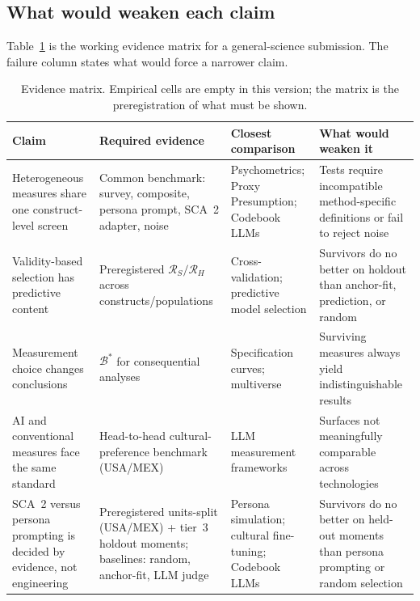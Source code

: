\documentclass[10pt,letterpaper]{article}
\newcommand{\Rset}{\mathcal{R}}
\newcommand{\Bset}{\mathcal{B}}
\begin{document}
\subsection{What would weaken each claim}
Table~\ref{tab:evidence} is the working evidence matrix for a general-science submission.
The failure column states what would force a narrower claim.

\begin{table}[t]
\centering
\footnotesize
\caption{Evidence matrix.
Empirical cells are empty in this version; the matrix is the preregistration of what must be shown.}
\label{tab:evidence}
\begin{tabularx}{\textwidth}{@{}>{\raggedright\arraybackslash}p{2.5cm} >{\raggedright\arraybackslash}p{3.2cm} >{\raggedright\arraybackslash}p{3.0cm} X@{}}
\toprule
\textbf{Claim} & \textbf{Required evidence} & \textbf{Closest comparison} & \textbf{What would weaken it} \\
\midrule
Heterogeneous measures share one construct-level screen & Common benchmark: survey, composite, persona prompt, SCA~2 adapter, noise & Psychometrics; Proxy Presumption; Codebook LLMs & Tests require incompatible method-specific definitions or fail to reject noise \\
Validity-based selection has predictive content & Preregistered $\Rset_S/\Rset_H$ across constructs/populations & Cross-validation; predictive model selection & Survivors do no better on holdout than anchor-fit, prediction, or random \\
Measurement choice changes conclusions & $\Bset^*$ for consequential analyses & Specification curves; multiverse & Surviving measures always yield indistinguishable results \\
AI and conventional measures face the same standard & Head-to-head cultural-preference benchmark (USA/MEX) & LLM measurement frameworks & Surfaces not meaningfully comparable across technologies \\
SCA~2 versus persona prompting is decided by evidence, not engineering & Preregistered units-split (USA/MEX) + tier~3 holdout moments; baselines: random, anchor-fit, LLM judge & Persona simulation; cultural fine-tuning; Codebook LLMs & Survivors do no better on held-out moments than persona prompting or random selection \\

\bottomrule
\end{tabularx}
\end{table}

\end{document}
